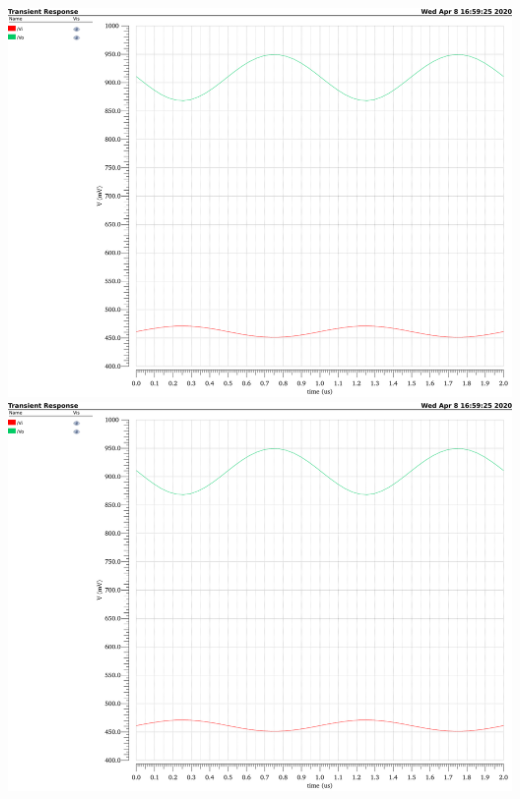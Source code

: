 \documentclass{homework}
\begin{document}
	\begin{center}
		\includegraphics[width=\linewidth,page=1]{hw5}
		\includegraphics[width=\linewidth,page=2]{hw5}
	\end{center}
\end{document}
